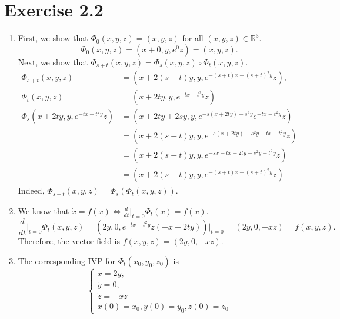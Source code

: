 \documentclass{article}
\theoremstyle{named}
\begin{document}
\section*{Exercise 2.2}
\begin{enumerate}[label=(\roman*)]
	\item First, we show that $\Phi_0(x,y,z) = (x,y,z)$ for all $(x,y,z) \in \mathbb R^3$. 
	\[
		\Phi_0(x,y,z) = (x+0, y, e^{0}z) = (x,y,z).
	\]
	Next, we show that $\Phi_{s+t}(x,y,z) = \Phi_s(x,y,z) \circ \Phi_t(x,y,z)$. 
	\begin{align*}
		\Phi_{s+t}(x,y,z) &= (x+2(s+t)y, y, e^{-(s+t)x - (s+t)^2y}z), \\
		\Phi_t(x,y,z) &= (x+2ty,y,e^{-tx-t^2y}z) \\
		\Phi_s(x+2ty, y, e^{-tx-t^2y}z) &= (x+2ty+2sy, y, e^{-s(x+2ty)-s^2y}e^{-tx-t^2y}z) \\
		&= (x+2(s+t)y, y, e^{-s(x+2ty)-s^2y -tx-t^2y}z)  \\
		&= (x+2(s+t)y, y, e^{-sx-tx-2ty-s^2y-t^2y}z) \\
		&= (x+2(s+t)y, y, e^{-(s+t)x - (s+t)^2y}z)
	\end{align*}
	Indeed, $	\Phi_{s+t}(x,y,z)  = 	\Phi_s(\Phi_t(x,y,z))$.
	
	\item We know that $\dot x = f(x) \iff \frac{d}{dt}\Big\vert_{t=0}\Phi_t(x) = f(x)$. 
	\[
		\frac{d}{dt} \vert_{t=0}\Phi_t(x,y,z) = (2y,0,e^{-tx-t^2y}z(-x-2ty))\vert_{t=0} = (2y, 0,-xz) = f(x,y,z). 
	\]
	Therefore, the vector field is $ f(x,y,z) = (2y, 0,-xz)$.
	
	\item The corresponding IVP for $\Phi_t(x_0,y_0,z_0)$ is
	\[
		\begin{cases}
			\dot x = 2y, \\
			\dot y = 0, \\
			\dot z = -xz \\
			x(0) = x_0, y(0) = y_0, z(0) = z_0
		\end{cases}
	\] 
\end{enumerate}
\end{document}
